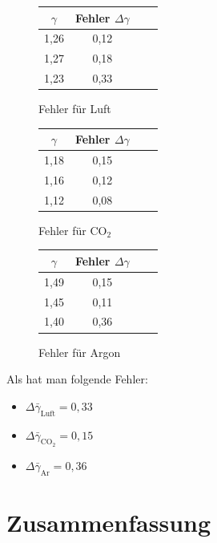 \documentclass[fontsize=12pt]{scrartcl}
\begin{document}
\begin{figure}[H]
\centering
\caption{Fehler für Luft}
\begin{tabular}{|c|c|c|c|} \hline
 $\gamma$  & Fehler  $\Delta \gamma$\\ \hline
1,26	&0,12	\\ \hline
1,27	&0,18	\\ \hline
1,23	&0,33	\\ \hline
\end{tabular}				 
\end{figure}
\begin{figure}[H]
\vspace{-24pt}
\centering
\caption{Fehler für CO$_2$}
\begin{tabular}{|c|c|c|c|} \hline
 $\gamma$ & Fehler  $\Delta \gamma$\\ \hline
1,18	&0,15	\\ \hline
1,16	&0,12	\\ \hline
1,12	&0,08	\\ \hline
\end{tabular}				 
\end{figure}
\begin{figure}[H]
\vspace{-24pt}
\centering
\caption{Fehler für Argon}
\begin{tabular}{|c|c|c|c|} \hline
 $\gamma$ & Fehler  $\Delta \gamma$ \\ \hline
1,49	&0,15	\\ \hline
1,45	&0,11	\\ \hline
1,40	&0,36	\\ \hline
\end{tabular}				 
\end{figure}

Als hat man folgende Fehler:
\begin{itemize}
\centering
\item[] $\Delta\bar{\gamma}_{\text{Luft}} = 0,33$ 
\item[] $\Delta \bar{\gamma}_{\text{CO}_2} = 0,15$
\item[] $\Delta \bar{\gamma}_{\text{Ar}} =0,36$ 
\end{itemize}


\section{Zusammenfassung}
\end{document}

